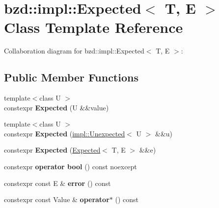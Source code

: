 \hypertarget{classbzd_1_1impl_1_1Expected}{}\section{bzd\+:\+:impl\+:\+:Expected$<$ T, E $>$ Class Template Reference}
\label{classbzd_1_1impl_1_1Expected}


Collaboration diagram for bzd\+:\+:impl\+:\+:Expected$<$ T, E $>$\+:
\subsection*{Public Member Functions}
\begin{DoxyCompactItemize}
\item 
\mbox{\label{classbzd_1_1impl_1_1Expected_a7b523a10f1852d5ec8a2972e23d03ba6}} 
{\footnotesize template$<$class U $>$ }\\constexpr {\bfseries Expected} (U \&\&value)
\item 
\mbox{\label{classbzd_1_1impl_1_1Expected_ab94e6d143ab9a6c52de1f35a6985eda9}} 
{\footnotesize template$<$class U $>$ }\\constexpr {\bfseries Expected} (\hyperlink{classbzd_1_1impl_1_1Unexpected}{impl\+::\+Unexpected}$<$ U $>$ \&\&u)
\item 
\mbox{\label{classbzd_1_1impl_1_1Expected_ac566f5a9a3ea35d0d23f47a9488d291a}} 
constexpr {\bfseries Expected} (\hyperlink{classbzd_1_1impl_1_1Expected}{Expected}$<$ T, E $>$ \&\&e)
\item 
\mbox{\label{classbzd_1_1impl_1_1Expected_a84c2762ce66b6a84846e33cae3f9ac42}} 
constexpr {\bfseries operator bool} () const noexcept
\item 
\mbox{\label{classbzd_1_1impl_1_1Expected_a8b8dc54a832dbc0416bfd0c9db9400dc}} 
constexpr const E \& {\bfseries error} () const
\item 
\mbox{\label{classbzd_1_1impl_1_1Expected_a4daf3d7412d3b3cd9eb9caaa4813066d}} 
constexpr const Value \& {\bfseries operator$\ast$} () const
\item 

\end{DoxyCompactItemize}
